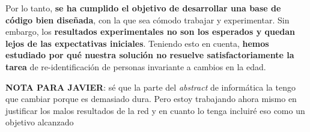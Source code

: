 Por lo tanto, \textbf{se ha cumplido el objetivo de desarrollar una base de código bien diseñada}, con la que sea cómodo trabajar y experimentar. Sin embargo, los \textbf{resultados experimentales no son los esperados y quedan lejos de las expectativas iniciales}. Teniendo esto en cuenta, \textbf{hemos estudiado por qué nuestra solución no resuelve satisfactoriamente la tarea} de re-identificación de personas invariante a cambios en la edad.

\textbf{NOTA PARA JAVIER}: sé que la parte del \textit{abstract} de informática la tengo que cambiar porque es demasiado dura. Pero estoy trabajando ahora mismo en justificar los malos resultados de la red y en cuanto lo tenga incluiré eso como un objetivo alcanzado

\endinput
